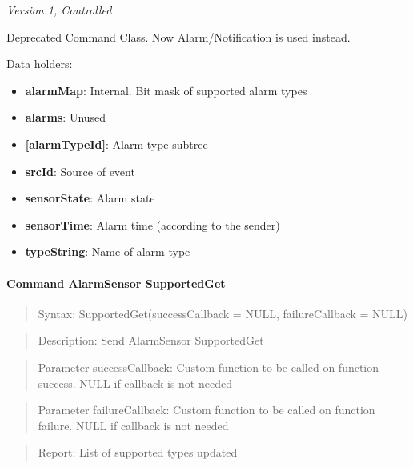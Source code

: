 \textit{Version 1, Controlled}
\newline

Deprecated Command Class. Now Alarm/Notification is used instead.
\newline

\noindent
Data holders:

\begin{itemize}
\item \textbf{alarmMap}: Internal. Bit mask of supported alarm types
\item \textbf{alarms}: Unused
\item \textbf{[alarmTypeId]}: Alarm type subtree
\item \qquad\textbf{srcId}: Source of event
\item \qquad\textbf{sensorState}: Alarm state
\item \qquad\textbf{sensorTime}: Alarm time (according to the sender)
\item \qquad\textbf{typeString}: Name of alarm type
\end{itemize}

\paragraph{Command AlarmSensor SupportedGet}
\begin{quote}Syntax: SupportedGet(successCallback = NULL, failureCallback = NULL)\end{quote}
\begin{quote}Description: Send AlarmSensor SupportedGet\end{quote}
\begin{quote}Parameter successCallback: Custom function to be called on function success. NULL if callback is not needed\end{quote}
\begin{quote}Parameter failureCallback: Custom function to be called on function failure. NULL if callback is not needed\end{quote}
\begin{quote}Report: List of supported types updated\end{quote}

